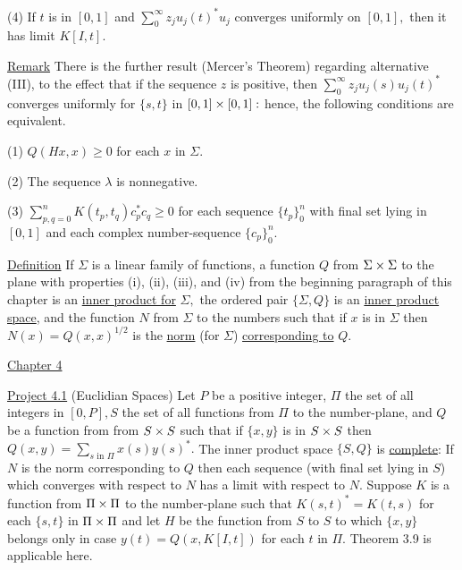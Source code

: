 \indent (4) If $t$ is in $[0,1]$ and $\sum_{0}^{\infty}z_{j}u_{j}(t)^{*}u_{j}$ converges uniformly on $[0,1],$ then it has limit $K[I,t].$ \nl

\underline{Remark}  There is the further result (Mercer's Theorem) regarding alternative (III), to the effect that if the sequence $z$ is positive, then $\sum_{0}^{\infty}z_{j}u_{j}(s)u_{j}(t)^{*}$ converges uniformly for $\{s,t\}$
in $[0,1] \times [0,1]:$  hence, the following conditions are equivalent. \nl

\indent (1) $Q(Hx,x) \geq 0$ for each $x$ in $\Sigma.$\nl

\indent (2) The sequence $\lambda$ is nonnegative.\nl

\indent (3) $\sum_{p,q=0}^{n}K(t_{p},t_{q})c_{p}^{*}c_q \geq 0$ for each sequence $\{t_{p}\}_{0}^{n}$ with final set lying in $[0,1]$ and each complex number-sequence $\{c_{p}\}_{0}^{n}.$\nl

\underline{Definition} If $\Sigma$ is a linear family of functions, a function $Q$ from $\Sigma \times \Sigma$ to the plane with properties (i), (ii), (iii), and (iv) from the beginning paragraph of this chapter is an \underline{inner product for} $\Sigma,$ the ordered pair $\{\Sigma,Q\}$ is an \underline{inner product space}, and the function $N$ from $\Sigma$ to the numbers such that if $x$ is in $\Sigma$ then $N(x) = Q(x,x)^{1/2}$ is the \underline{norm} (for $\Sigma$) \underline{corresponding to} $Q.$\np

\begin{center}
\underline{Chapter 4}
\end{center}

\underline{Project 4.1}  (Euclidian Spaces)  Let $P$ be a positive integer, $\Pi$ the set of all integers in $[0, P], S$ the set of all functions from $\Pi$ to the number-plane, and $Q$ be a function from from $S \times S$ such that if $\{x,y\}$ is in $S \times S$ then $Q(x,y) = \sum_{s\text{~in~} \Pi}x(s)y(s)^{*}.$  The inner product space $\{S,Q\}$ is \underline{complete}:  If $N$ is the norm corresponding to $Q$ then each sequence (with final set lying in $S$) which converges with respect to $N$ has a limit with respect to $N$.  Suppose $K$ is a function from $\Pi \times \Pi$ to the number-plane such that $K(s,t)^{*} = K(t,s)$ for each $\{s,t\}$ in $\Pi \times \Pi$ and let $H$ be the function from $S$ to $S$ to which $\{x,y\}$ belongs only in case $y(t) = Q(x,K[I,t])$ for each $t$ in $\Pi.$  Theorem 3.9 is applicable here.\nl

